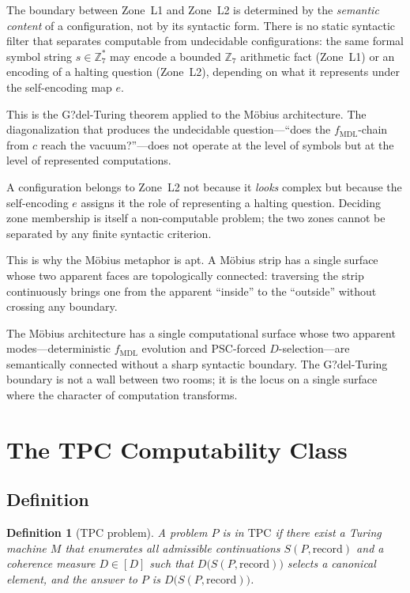 \documentclass[12pt,letterpaper]{article}
\newtheorem{definition}[theorem]{Definition}
\newcommand{\fmdl}{f_{\mathrm{MDL}}}
\newcommand{\Zseven}{\mathbb{Z}_7}
\newcommand{\Dclass}{[D]}
\newcommand{\TPC}{\mathrm{TPC}}
\begin{document}
The boundary between Zone~L1 and Zone~L2 is determined by the \emph{semantic
content} of a configuration, not by its syntactic form.  There is no static
syntactic filter that separates computable from undecidable configurations: the
same formal symbol string $s \in \Zseven^*$ may encode a bounded $\Zseven$
arithmetic fact (Zone~L1) or an encoding of a halting question (Zone~L2),
depending on what it represents under the self-encoding map $e$.

This is the G?del-Turing theorem applied to the M\"{o}bius architecture.  The
diagonalization that produces the undecidable question---``does the $\fmdl$-chain
from $c$ reach the vacuum?''---does not operate at the level of symbols but at
the level of represented computations.

A configuration belongs to Zone~L2 not because it \emph{looks} complex but because
the self-encoding $e$ assigns it the role of representing a halting question.
Deciding zone membership is itself a non-computable problem; the two zones cannot be
separated by any finite syntactic criterion.

This is why the M\"{o}bius metaphor is apt.  A M\"{o}bius strip has a single surface whose
two apparent faces are topologically connected: traversing the strip continuously
brings one from the apparent ``inside'' to the ``outside'' without crossing any
boundary.

The M\"{o}bius architecture has a single computational surface whose two apparent
modes---deterministic $\fmdl$ evolution and PSC-forced $D$-selection---are semantically
connected without a sharp syntactic boundary.  The G?del-Turing boundary is not a
wall between two rooms; it is the locus on a single surface where the character of
computation transforms.

\section{The TPC Computability Class}
\label{sec:tpc}

\subsection{Definition}
\label{sec:tpc-def}

\begin{definition}[TPC problem]
A problem $P$ is in $\TPC$ if there exist a Turing machine $M$ that enumerates
all admissible continuations $S(P, \mathrm{record})$ and a coherence measure
$D \in \Dclass$ such that $D\bigl(S(P, \mathrm{record})\bigr)$ selects a canonical
element, and the answer to $P$ is $D\bigl(S(P, \mathrm{record})\bigr)$.
\end{definition}
\end{document}
